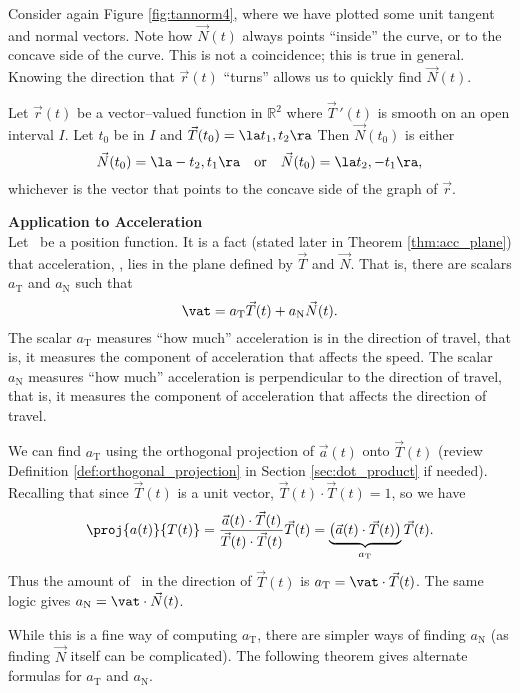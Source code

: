 Consider again Figure \ref{fig:tannorm4}, where we have plotted some unit tangent and normal vectors. Note how $\vec N(t)$ always points ``inside'' the curve, or to the concave side of the curve. This is not a coincidence; this is true in general. Knowing the direction that $\vec r(t)$ ``turns'' allows us to quickly find $\vec N(t)$.


{Let $\vec r(t)$ be a vector--valued function in $\mathbb{R}^2$ where $\vec T\,'(t)$ is smooth on an open interval $I$. Let $t_0$ be in $I$ and $\vec T(t_0) = \la t_1,t_2\ra$ Then $\vec N(t_0)$ is either
\[
\vec N(t_0) = \la -t_2,t_1\ra \quad \text{or}\quad \vec N(t_0) = \la t_2,-t_1\ra,
\]
whichever is the vector that points to the concave side of the graph of $\vec r$.
}

\noindent\textbf{\large Application to Acceleration}\\

Let \vrt\ be a position function. It is a fact (stated later in Theorem \ref{thm:acc_plane}) %
 that acceleration, \vat, lies in the plane defined by $\vec T$ and $\vec N$. That is, there are scalars $a_{\text{T}}$ and $a_{\text{N}}$ such that 
\[
\vat = a_{\text{T}}\vec T(t) + a_{\text{N}}\vec N(t).
\]
The scalar $a_{\text{T}}$ measures ``how much'' acceleration is in the direction of travel, that is, it measures the component of acceleration that affects the speed. The scalar $a_{\text{N}}$ measures ``how much'' acceleration is perpendicular to the direction of travel, that is, it measures the component of acceleration that affects the direction of travel.

We can find $a_{\text{T}}$ using the orthogonal projection of $\vec a(t)$ onto $\vec T(t)$ (review Definition \ref{def:orthogonal_projection} in Section \ref{sec:dot_product} if needed).
Recalling that since $\vec T(t)$ is a unit vector, $\vec T(t)\cdot\vec T(t)=1$, so we have 
\[
\proj{a(t)}{T(t)} = \frac{\vec a(t)\cdot\vec T(t)}{\vec T(t)\cdot\vec T(t)}\vec T(t) = \underbrace{\big(\vec a(t)\cdot\vec T(t)\big)}_{a_{\text{T}}}\vec T(t).
\]
Thus the amount of \vat\ in the direction of $\vec T(t)$ is $a_{\text{T}}=\vat\cdot\vec T(t)$. The same logic gives $a_{\text{N}} = \vat\cdot\vec N(t)$.

While this is a fine way of computing $a_{\text{T}}$, there are simpler ways of finding $a_{\text{N}}$ (as finding $\vec N$ itself can be complicated). The following theorem gives alternate formulas for $a_{\text{T}}$ and $a_{\text{N}}$.

